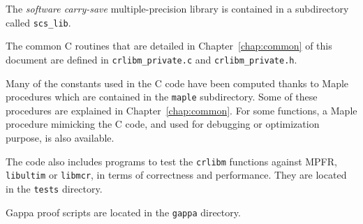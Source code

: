 The \emph{software carry-save} multiple-precision library is contained
in a subdirectory called \texttt{scs\_lib}.

The common C routines that are detailed in Chapter~\ref{chap:common} of
this document are defined in \texttt{crlibm\_private.c} and
\texttt{crlibm\_private.h}.

Many of the constants used in the C code have been computed thanks to
Maple procedures which are contained in the \texttt{maple}
subdirectory. Some of these procedures are explained in
Chapter~\ref{chap:common}. For some functions, a Maple procedure
mimicking the C code, and used for debugging or optimization purpose,
is also available.


The code also includes programs to test the \texttt{crlibm} functions
against MPFR, \texttt{libultim} or \texttt{libmcr}, in terms of correctness and
performance. They are located in the \texttt{tests} directory.

Gappa proof scripts are located in the \texttt{gappa} directory.

